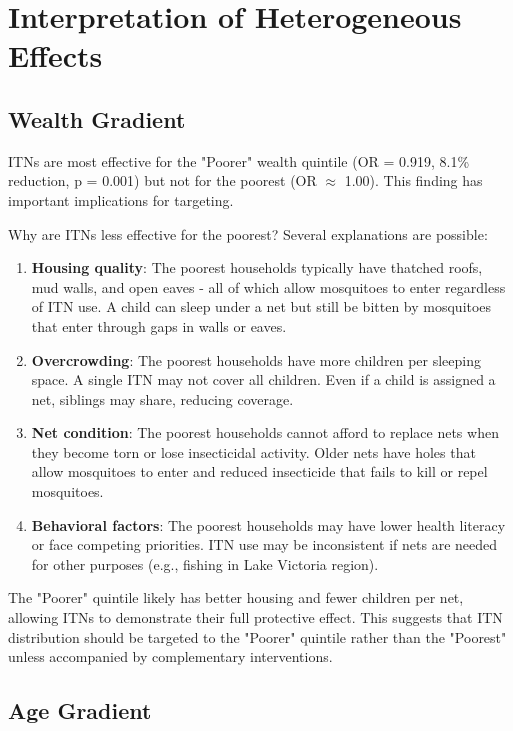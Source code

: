 \section{Interpretation of Heterogeneous Effects}

\subsection{Wealth Gradient}

ITNs are most effective for the "Poorer" wealth quintile (OR = 0.919, 8.1\% reduction, p = 0.001) but not for the poorest (OR $\approx$ 1.00). This finding has important implications for targeting.

Why are ITNs less effective for the poorest? Several explanations are possible:

\begin{enumerate}
	\item \textbf{Housing quality}: The poorest households typically have thatched roofs, mud walls, and open eaves - all of which allow mosquitoes to enter regardless of ITN use. A child can sleep under a net but still be bitten by mosquitoes that enter through gaps in walls or eaves.
	
	\item \textbf{Overcrowding}: The poorest households have more children per sleeping space. A single ITN may not cover all children. Even if a child is assigned a net, siblings may share, reducing coverage.
	
	\item \textbf{Net condition}: The poorest households cannot afford to replace nets when they become torn or lose insecticidal activity. Older nets have holes that allow mosquitoes to enter and reduced insecticide that fails to kill or repel mosquitoes.
	
	\item \textbf{Behavioral factors}: The poorest households may have lower health literacy or face competing priorities. ITN use may be inconsistent if nets are needed for other purposes (e.g., fishing in Lake Victoria region).
\end{enumerate}

The "Poorer" quintile likely has better housing and fewer children per net, allowing ITNs to demonstrate their full protective effect. This suggests that ITN distribution should be targeted to the "Poorer" quintile rather than the "Poorest" unless accompanied by complementary interventions.

\subsection{Age Gradient}

